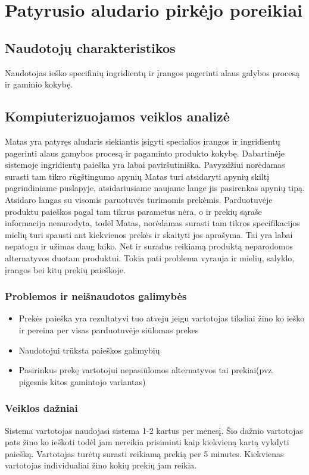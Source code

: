 \documentclass[oneside]{VUMIFPSkursinis}
\begin{document}
\section{Patyrusio aludario pirkėjo poreikiai}
	\subsection{Naudotojų charakteristikos}
		Naudotojas ieško specifinių ingridientų ir įrangos pagerinti alaus galybos procesą ir gaminio kokybę.
	\subsection{Kompiuterizuojamos veiklos analizė}
		Matas yra patyręs aludaris siekiantis įsigyti specialios įrangos ir ingridientų pagerinti alaus gamybos procesą ir pagaminto produkto kokybę.
		Dabartinėje sistemoje ingridientų paieška yra labai paviršutiniška.
		Pavyzdžiui norėdamas surasti tam tikro rūgštingumo apynių Matas turi atsidaryti apynių skiltį pagrindiniame puslapyje, atsidariusiame naujame lange jis pasirenkas apynių tipą.
		Atsidaro langas su visomis paruotuvės turimomis prekėmis.
		Parduotuvėje produktu paieškos pagal tam tikrus parametus nėra, o ir prekių sąraše informacija nenurodyta, todėl Matas, norėdamas surasti tam tikros specifikacijos mielių turi spausti ant kiekvienos prekės ir skaityti jos aprašyma.
		Tai yra labai nepatogu ir užimas daug laiko.
		Net ir suradus reikiamą produktą neparodomos alternatyvos duotam produktui.
		Tokia pati problema vyrauja ir mielių, salyklo, įrangos bei kitų prekių paieškoje.

	\subsubsection{Problemos ir neišnaudotos galimybės}
		\begin{itemize}
			\item{Prekės paieška yra rezultatyvi tuo atveju jeigu vartotojas tiksliai žino ko ieško ir pereina per visas parduotuvėje siūlomas prekes}
			\item{Naudotojui trūksta paieškos galimybių}
			\item{Pasirinkus prekę vartotojui nepasiūlomos alternatyvos tai prekiai(pvz. pigesnis kitos gamintojo variantas)}
		\end{itemize}
	\subsubsection{Veiklos dažniai}
		Sistema vartotojas naudojasi sistema 1-2 kartus per mėnesį.
		Šio dažnio vartotojas pats žino ko ieškoti todėl jam nereikia prisiminti kaip kiekvieną kartą vykdyti paiešką.
		Vartotojas turėtų surasti reikiamą prekią per 5 minutes.
		Kiekvienas vartotojas individualiai žino kokių prekių jam reikia.
\end{document}
